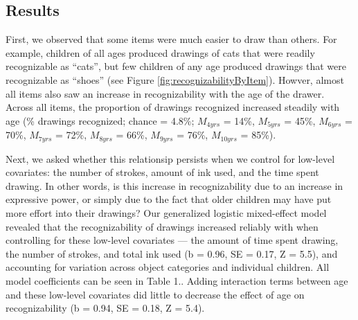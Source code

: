 \documentclass[10pt, letterpaper]{article}
\begin{document}
\subsection{Results}\label{results}

First, we observed that some items were much easier to draw than others.
For example, children of all ages produced drawings of cats that were
readily recognizable as ``cats'', but few children of any age produced
drawings that were recognizable as ``shoes'' (see Figure
\ref{fig:recognizabilityByItem}). Howver, almost all items also saw an
increase in recognizability with the age of the drawer. Across all
items, the proportion of drawings recognized increased steadily with age
(\% drawings recognized; chance = 4.8\%; \(M_{4yrs}\) = 14\%,
\(M_{5yrs}\) = 45\%, \(M_{6yrs}\) = 70\%, \(M_{7yrs}\) = 72\%,
\(M_{8yrs}\) = 66\%, \(M_{9yrs}\) = 76\%, \(M_{10yrs}\) = 85\%).

Next, we asked whether this relationsip persists when we control for
low-level covariates: the number of strokes, amount of ink used, and the
time spent drawing. In other words, is this increase in recognizability
due to an increase in expressive power, or simply due to the fact that
older children may have put more effort into their drawings? Our
generalized logistic mixed-effect model revealed that the
recognizability of drawings increased reliably with when controlling for
these low-level covariates --- the amount of time spent drawing, the
number of strokes, and total ink used (b = 0.96, SE = 0.17, Z = 5.5),
and accounting for variation across object categories and individual
children. All model coefficients can be seen in Table 1.. Adding
interaction terms between age and these low-level covariates did little
to decrease the effect of age on recognizability (b = 0.94, SE = 0.18, Z
= 5.4).
\end{document}
